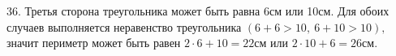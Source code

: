 36. Третья сторона треугольника может быть равна 6см или 10см. Для обоих случаев выполняется неравенство треугольника $(6+6>10,\ 6+10>10),$ значит периметр может быть равен $2\cdot6+10=22$см или $2\cdot10+6=26$см.\\
